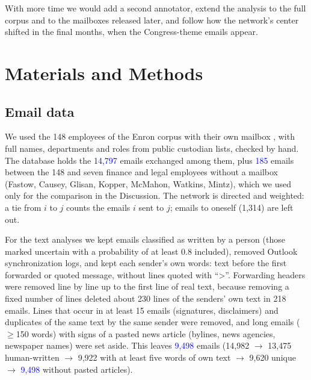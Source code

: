 \documentclass[9pt,twocolumn,twoside]{pnas-new}
\newcommand{\chk}[1]{\textcolor{blue}{#1}}
\begin{document}
With more time we would add a second annotator, extend the analysis to the full corpus and
to the mailboxes released later, and follow how the network's center shifted in the final
months, when the Congress-theme emails appear.

\section*{Materials and Methods}

\subsection*{Email data}
We used the 148 employees of the Enron corpus with their own mailbox \cite{klimt2004},
with full names, departments and roles from public custodian lists, checked by hand. The
database holds the \chk{14,797} emails exchanged among them, plus \chk{185} emails between
the 148 and seven finance and legal employees without a mailbox (Fastow, Causey, Glisan,
Kopper, McMahon, Watkins, Mintz), which we used only for the comparison in the Discussion.
The network is directed and weighted: a tie from $i$ to $j$ counts the emails $i$ sent to
$j$; emails to oneself (1,314) are left out.

For the text analyses we kept emails classified as written by a person (those marked
uncertain with a probability of at least 0.8 included), removed Outlook synchronization
logs, and kept each sender's own words: text before the first forwarded or quoted message,
without lines quoted with ``>''. Forwarding headers were removed line by line up to the
first line of real text, because removing a fixed number of lines deleted about 230
lines of the senders' own text in 218 emails. Lines that occur in at least 15 emails
(signatures, disclaimers) and duplicates of the same text by the same sender were removed,
and long emails ($\ge$150 words) with signs of a pasted news article (bylines, news
agencies, newspaper names) were set aside. This leaves \chk{9,498} emails
(14,982 $\to$ 13,475 human-written $\to$ 9,922 with at least five words of own text
$\to$ 9,620 unique $\to$ \chk{9,498} without pasted articles).
\end{document}
